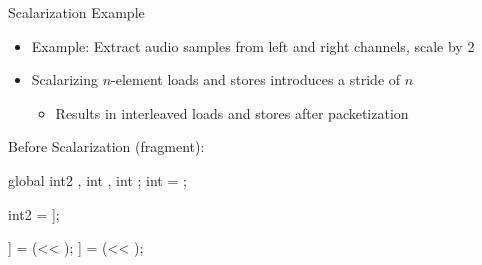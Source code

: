
%
%


%
%


\begin{frame}[fragile]{Scalarization Example}

\begin{itemize}
    \item Example: Extract audio samples from left and right channels, scale by 2
    \item Scalarizing $n$-element loads and stores introduces a stride of $n$
    \begin{itemize}
        \item Results in interleaved loads and stores after packetization
    \end{itemize}
\end{itemize}

\begin{minipage}[t]{0.45\linewidth}

\vspace{0.1ex}
Before Scalarization (fragment):
\begin{codebox}[commandchars=\\\[\]]
global int2 \uniform[*src], int \uniform[*left], int \uniform[*right];
int \varying[tid] = ;


int2 \varying[sample] = \uniform[src]\idx[\varying[tid]];


\uniform[left]\idx[\varying[tid]] = (\varying[sample.x] << \uniform[1]);
\uniform[right]\idx[\varying[tid]] = (\varying[sample.y] << \uniform[1]);
\end{codebox}

\end{minipage}
\hspace{1em}
\begin{minipage}[t]{0.49\linewidth}


\end{minipage}
\end{frame}
